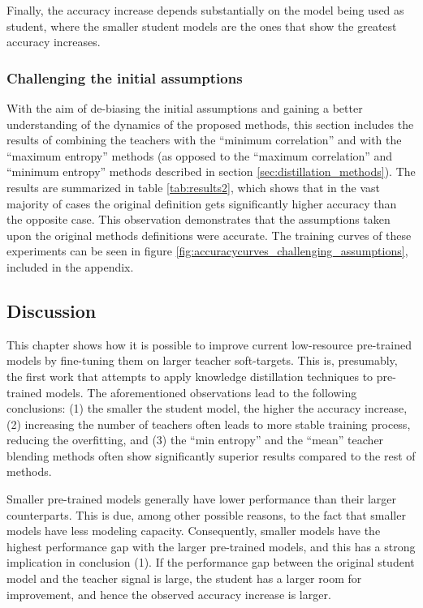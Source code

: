  Finally, the accuracy increase depends substantially on the model being used as student, where the smaller student models are the ones that show the greatest accuracy increases.
 
 \subsubsection{Challenging the initial assumptions}
 With the aim of de-biasing the initial assumptions and gaining a better understanding of the dynamics of the proposed methods, this section includes the results of combining the teachers with the ``minimum correlation'' and with the ``maximum entropy'' methods (as opposed to the ``maximum correlation'' and ``minimum entropy'' methods described in section \ref{sec:distillation_methods}). The results are summarized in table \ref{tab:results2}, which shows that in the vast majority of cases the original definition gets significantly higher accuracy than the opposite case. This observation demonstrates that the assumptions taken upon the original methods definitions were accurate. The training curves of these experiments can be seen in figure \ref{fig:accuracycurves_challenging_assumptions}, included in the appendix.
 


 \subsection{Discussion}  \label{sec:distillation_discussion}
This chapter shows how it is possible to improve current low-resource pre-trained models by fine-tuning them on larger teacher soft-targets. This is, presumably, the first work that attempts to apply knowledge distillation techniques to pre-trained models. The aforementioned observations lead to the following conclusions: (1) the smaller the student model, the higher the accuracy increase, (2) increasing the number of teachers often leads to more stable training process, reducing the overfitting, and (3) the ``min entropy'' and the ``mean'' teacher blending methods often show significantly superior results compared to the rest of methods.
 
 Smaller pre-trained models generally have lower performance than their larger counterparts. This is due, among other possible reasons, to the fact that smaller models have less modeling capacity. Consequently, smaller models have the highest performance gap with the larger pre-trained models, and this has a strong implication in conclusion (1). If the performance gap between the original student model and the teacher signal is large, the student has a larger room for improvement, and hence the observed accuracy increase is larger.
 
